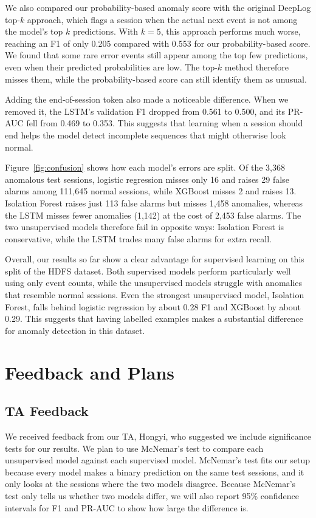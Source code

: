 \documentclass[11pt]{article}
\begin{document}
We also compared our probability-based anomaly score with the original DeepLog top-$k$ approach, which flags a session when the actual next event is not among the model's top $k$ predictions. With $k=5$, this approach performs much worse, reaching an F1 of only 0.205 compared with 0.553 for our probability-based score. We found that some rare error events still appear among the top few predictions, even when their predicted probabilities are low. The top-$k$ method therefore misses them, while the probability-based score can still identify them as unusual.

Adding the end-of-session token also made a noticeable difference. When we removed it, the LSTM's validation F1 dropped from 0.561 to 0.500, and its PR-AUC fell from 0.469 to 0.353. This suggests that learning when a session should end helps the model detect incomplete sequences that might otherwise look normal.

Figure~\ref{fig:confusion} shows how each model's errors are split. Of the 3,368 anomalous test sessions, logistic regression misses only 16 and raises 29 false alarms among 111,645 normal sessions, while XGBoost misses 2 and raises 13. Isolation Forest raises just 113 false alarms but misses 1,458 anomalies, whereas the LSTM misses fewer anomalies (1,142) at the cost of 2,453 false alarms. The two unsupervised models therefore fail in opposite ways: Isolation Forest is conservative, while the LSTM trades many false alarms for extra recall.

Overall, our results so far show a clear advantage for supervised learning on this split of the HDFS dataset. Both supervised models perform particularly well using only event counts, while the unsupervised models struggle with anomalies that resemble normal sessions. Even the strongest unsupervised model, Isolation Forest, falls behind logistic regression by about 0.28 F1 and XGBoost by about 0.29. This suggests that having labelled examples makes a substantial difference for anomaly detection in this dataset.


\section{Feedback and Plans}
\label{sec:plans}

\subsection{TA Feedback}
We received feedback from our TA, Hongyi, who suggested we include significance tests
for our results. We plan to use McNemar's test to compare each unsupervised model
against each supervised model. McNemar's test fits our setup because every model makes
a binary prediction on the same test sessions, and it only looks at the sessions where
the two models disagree. Because McNemar's test only tells us whether two models
differ, we will also report 95\% confidence intervals for F1 and PR-AUC to show how
large the difference is.
\end{document}
